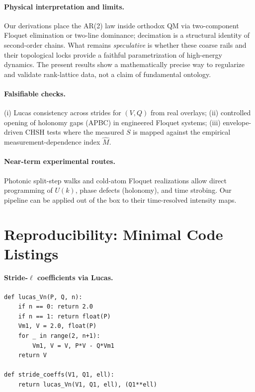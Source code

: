 \documentclass[11pt]{article}
\begin{document}
\paragraph{Physical interpretation and limits.}
Our derivations place the AR(2) law inside orthodox QM via two-component Floquet elimination or
two-line dominance; decimation is a structural identity of second-order chains. What remains
\emph{speculative} is whether these coarse rails and their topological locks provide a faithful
parametrization of high-energy dynamics. The present results show a mathematically precise way to
regularize and validate rank-lattice data, not a claim of fundamental ontology.

\paragraph{Falsifiable checks.}
(i) Lucas consistency across strides for $(V,Q)$ from real overlays; (ii) controlled opening of
holonomy gaps (APBC) in engineered Floquet systems; (iii) envelope-driven CHSH tests where the
measured $S$ is mapped against the empirical measurement-dependence index $\hat M$.

\paragraph{Near-term experimental routes.}
Photonic split-step walks and cold-atom Floquet realizations allow direct programming of $U(k)$,
phase defects (holonomy), and time strobing. Our pipeline can be applied out of the box to their
time-resolved intensity maps.

\section*{Reproducibility: Minimal Code Listings}

\paragraph{Stride-$\ell$ coefficients via Lucas.}
\begin{verbatim}
def lucas_Vn(P, Q, n):
    if n == 0: return 2.0
    if n == 1: return float(P)
    Vm1, V = 2.0, float(P)
    for _ in range(2, n+1):
        Vm1, V = V, P*V - Q*Vm1
    return V

def stride_coeffs(V1, Q1, ell):
    return lucas_Vn(V1, Q1, ell), (Q1**ell)
\end{verbatim}
\end{document}
